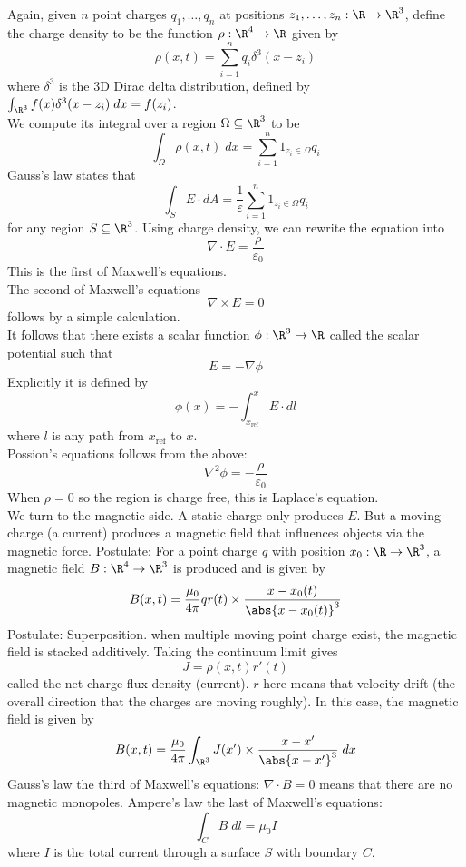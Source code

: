 \documentclass[a4paper]{article}
\begin{document}
Again, given $n$ point charges $q_1,\dots,q_n$ at positions $z_1,\dots,z_n:\R\to\R^3$, define the charge density to be the function $\rho:\R^4\to\R$ given by $$\rho(x,t)=\sum_{i=1}^nq_i\delta^3(x-z_i)$$ where $\delta^3$ is the 3D Dirac delta distribution, defined by $\int_{\R^3}f(x)\delta^3(x-z_i)\;dx=f(z_i)$. \\

We compute its integral over a region $\Omega\subseteq\R^3$ to be $$\int_\Omega\rho(x,t)\;dx=\sum_{i=1}^n1_{z_i\in\Omega}q_i$$ Gauss's law states that $$\int_SE\cdot dA=\frac{1}{\varepsilon}\sum_{i=1}^n1_{z_i\in\Omega}q_i$$ for any region $S\subseteq\R^3$. Using charge density, we can rewrite the equation into $$\nabla\cdot E=\frac{\rho}{\varepsilon_0}$$ This is the first of Maxwell's equations. \\

The second of Maxwell's equations $$\nabla\times E=0$$ follows by a simple calculation. \\

It follows that there exists a scalar function $\phi:\R^3\to\R$ called the scalar potential such that $$E=-\nabla\phi$$ Explicitly it is defined by $$\phi(x)=-\int_{x_\text{ref}}^xE\cdot dl$$ where $l$ is any path from $x_\text{ref}$ to $x$. \\

Possion's equations follows from the above: $$\nabla^2\phi=-\frac{\rho}{\varepsilon_0}$$ When $\rho=0$ so the region is charge free, this is Laplace's equation. \\

We turn to the magnetic side. A static charge only produces $E$. But a moving charge (a current) produces a magnetic field that influences objects via the magnetic force. Postulate: For a point charge $q$ with position $x_0:\R\to\R^3$, a magnetic field $B:\R^4\to\R^3$ is produced and is given by $$B(x,t)=\frac{\mu_0}{4\pi}qr(t)\times\frac{x-x_0(t)}{\abs{x-x_0(t)}^3}$$ Postulate: Superposition. when multiple moving point charge exist, the magnetic field is stacked additively. Taking the continuum limit gives $$J=\rho(x,t)r'(t)$$ called the net charge flux density (current). $r$ here means that velocity drift (the overall direction that the charges are moving roughly). In this case, the magnetic field is given by $$B(x,t)=\frac{\mu_0}{4\pi}\int_{\R^3}J(x')\times\frac{x-x'}{\abs{x-x'}^3}\;dx$$ Gauss's law the third of Maxwell's equations: $\nabla\cdot B=0$ means that there are no magnetic monopoles. Ampere's law the last of Maxwell's equations: $$\int_CB\;dl=\mu_0 I$$ where $I$ is the total current through a surface $S$ with boundary $C$. 
\end{document}
